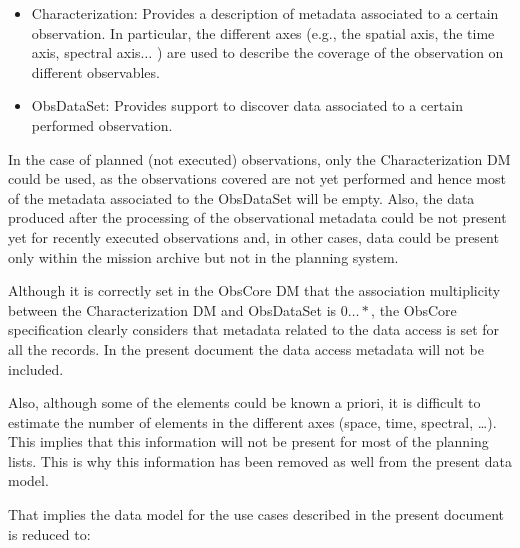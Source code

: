 \documentclass[11pt,a4paper]{ivoa}
\begin{document}
\begin{itemize}
	\item{Characterization: Provides a description of metadata associated to a
  certain observation. In particular, the different axes (e.g., the spatial
  axis, the time axis, spectral axis$ \ldots $ ) are used to describe the
  coverage of the observation on different observables.}

	\item{ObsDataSet: Provides support to discover data associated to a certain
  performed observation.}

\end{itemize}

In the case of planned (not executed) observations, only the Characterization
DM could be used, as the observations covered are not yet performed and hence
most of the metadata associated to the ObsDataSet will be empty. Also, the data
produced after the processing of the observational metadata could be not present
yet for recently executed observations and, in other cases, data could be
present only within the mission archive but not in the planning system.

Although it is correctly set in the ObsCore DM that the association multiplicity
between the Characterization DM and ObsDataSet is $0\ldots\ast$, the ObsCore
specification clearly considers that metadata related to the data access is set
for all the records. In the present document the data access metadata will not
be included.

Also, although some of the elements could be known a priori, it is difficult to
estimate the number of elements in the different axes (space, time, spectral,
\dots).
This implies that this information will not be present for most of the planning
lists. This is why this information has been removed as well from the present
data model.

That implies the data model for the use cases described in the present document
is reduced to:
\end{document}
